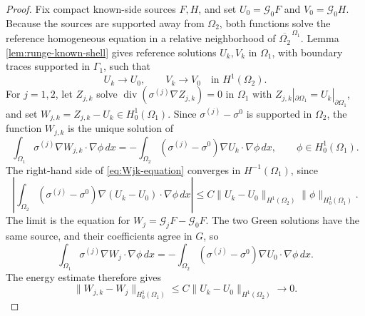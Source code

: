 \documentclass[11pt,oneside]{article}
\newcommand{\diver}{\operatorname{div}}
\begin{document}
\begin{proof}
Fix compact known-side sources \(F,H\), and set
\(U_0=\mathcal G_0F\) and \(V_0=\mathcal G_0H\).  Because the sources are
supported away from \(\Omega_2\), both functions solve the reference
homogeneous equation in a relative neighborhood of
\(\overline{\Omega_2}^{\,\Omega_1}\).  Lemma \ref{lem:runge-known-shell} gives
reference solutions \(U_k,V_k\) in
\(\Omega_1\), with boundary traces supported in \(\Gamma_1\), such that
\begin{equation}
  U_k\to U_0,
  \qquad
  V_k\to V_0
  \quad\text{in }H^1(\Omega_2).
  \label{eq:runge-approximation-pair}
\end{equation}
For \(j=1,2\), let \(Z_{j,k}\) solve
\(\diver(\sigma^{(j)}\nabla Z_{j,k})=0\) in \(\Omega_1\) with
\(Z_{j,k}|_{\partial\Omega_1}=U_k|_{\partial\Omega_1}\), and set
\(W_{j,k}=Z_{j,k}-U_k\in H^1_0(\Omega_1)\).  Since
\(\sigma^{(j)}-\sigma^0\) is supported in \(\Omega_2\), the function
\(W_{j,k}\) is the unique solution of
\begin{equation}
  \int_{\Omega_1}\sigma^{(j)}\nabla W_{j,k}\cdot\nabla\phi\,dx
  =-\int_{\Omega_2}(\sigma^{(j)}-\sigma^0)
       \nabla U_k\cdot\nabla\phi\,dx,
  \qquad \phi\in H^1_0(\Omega_1).
  \label{eq:Wjk-equation}
\end{equation}
The right-hand side of \eqref{eq:Wjk-equation} converges in
\(H^{-1}(\Omega_1)\), since
\begin{equation}
  \left|
  \int_{\Omega_2}(\sigma^{(j)}-\sigma^0)
       \nabla (U_k-U_0)\cdot\nabla\phi\,dx
  \right|
  \le C\|U_k-U_0\|_{H^1(\Omega_2)}\|\phi\|_{H^1_0(\Omega_1)} .
\end{equation}
The limit is the equation for \(W_j=\mathcal G_jF-\mathcal G_0F\).  The two
Green solutions have the same source, and their coefficients agree in \(G\),
so
\begin{equation}
  \int_{\Omega_1}\sigma^{(j)}\nabla W_j\cdot\nabla\phi\,dx
  =-\int_{\Omega_2}(\sigma^{(j)}-\sigma^0)
       \nabla U_0\cdot\nabla\phi\,dx .
\end{equation}
The energy estimate therefore gives
\begin{equation}
  \|W_{j,k}-W_j\|_{H^1_0(\Omega_1)}
  \le C\|U_k-U_0\|_{H^1(\Omega_2)}\to0.
  \label{eq:Wjk-convergence}
\end{equation}


\end{proof}
\end{document}
